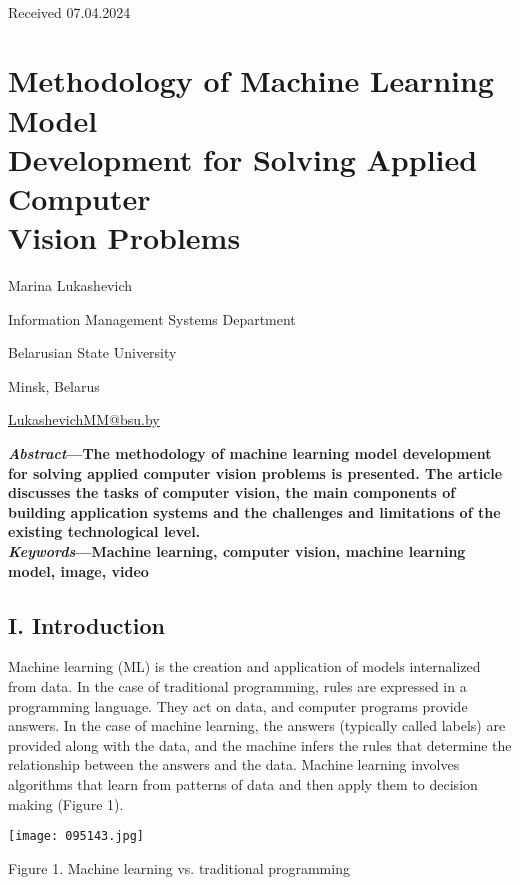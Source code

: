 \documentclass{article}
\begin{document}
{{\\
\begin{flushright}
Received 07.04.2024
\end{flushright}
\setcounter{page}{102}
\newpage
\onecolumn
{\centering\section*{ \Huge Methodology of Machine Learning Model
\\Development for Solving Applied Computer
\\Vision Problems}}
\begin{center}
 Marina Lukashevich \par
Information Management Systems Department \par
Belarusian State University \par
Minsk, Belarus \par
\href{LukashevichMM@bsu.by}{LukashevichMM@bsu.by}
\end{center}
\begin{multicols}
\raggedright{
\hspace{4mm}
\textbf{\textit{Abstract}—The methodology of machine learning model development for solving applied computer vision problems is presented. The article discusses the tasks of computer vision, the main components of building application systems and the challenges and limitations of the existing technological level.
\\\hspace{4mm} \textit{Keywords}—Machine learning, computer vision, machine learning model, image, video}
{\subsection*{I. Introduction}}
\hspace{4mm}Machine learning (ML) is the creation and application of models internalized from data. In the case of traditional programming, rules are expressed in a programming language. They act on data, and computer programs provide answers. In the case of machine learning, the answers (typically called labels) are provided along with the data, and the machine infers the rules that determine the relationship between the answers and the data. Machine learning involves algorithms that learn from patterns of data and then apply them to decision making (Figure 1).}
\begin{fi}
        \texttt{[image: 095143.jpg]}
        \caption{Figure 1. Machine learning vs. traditional programming}

\end{fi}
\end{multicols}}}
\end{document}
